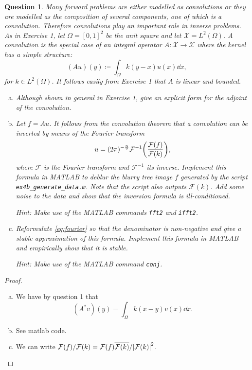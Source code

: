 \documentclass{article}
\theoremstyle{plain}
\newtheorem{question}{Question}
\theoremstyle{remark}
\newcommand{\Cal}{\mathcal}
\newcommand\FF{\Cal F}
\newcommand\ceq\coloneqq %
\newcommand\XX{\Cal X}
\begin{document}
\begin{question}
	Many forward problems are either modelled as convolutions or they are modelled as the composition of several components, one of which is a convolution. Therefore convolutions play an important role in inverse problems. As in Exercise 1, let $\Omega =[0, 1]^2$ be the unit square and let $\XX = L^2(\Omega)$. A convolution is the special case of an integral operator $A \colon \XX \to \XX$ where the kernel has a simple structure: 
	\[
	(Au)(y) \ceq \int_\Omega k(y - x) u(x) \dd{x},
	\]
	for $k \in L^2(\Omega)$. It follows easily from Exercise 1 that $A$ is linear and bounded. 
	\begin{enumerate}[(a)]
		\item Although shown in general in Exercise 1, give an explicit form for the adjoint of the convolution. 
		\item Let $f = Au$. It follows from the convolution theorem that a convolution can be inverted by means of the Fourier transform
		\begin{equation} \label{eq:fourier}
		u = (2\pi)^{-\frac n2} \FF^{-1} \qty(\frac{\FF(f)}{\FF(k)}),
		\end{equation}
		where $\FF$ is the Fourier transform and $\FF^{-1}$ its inverse. Implement this formula in \emph{MATLAB} to deblur the blurry tree image $f$ generated by the script \verb|ex4b_generate_data.m|. Note that the script also outputs $\FF(k)$. Add some noise to the data and show that the inversion formula is ill-conditioned.
		
		Hint: Make use of the \emph{MATLAB} commands \verb|fft2| and \verb|ifft2|. 
		
		\item Reformulate \cref{eq:fourier} so that the denominator is non-negative and give a stable approximation of this formula. Implement this formula in MATLAB and empirically show that it is stable.  
		
		Hint: Make use of the \emph{MATLAB} command \verb|conj|. 
	\end{enumerate}
\end{question}

\begin{proof}
	\begin{enumerate}[(a)]
		\item We have by question 1 that
		\[
		(A^* v)(y) = \int_\Omega k(x - y)v(x) \dd{x}.
		\]
		\item See matlab code. 
		\item We can write $\FF(f) / \FF(k) = \FF(f) \overline{\FF(k)} / \abs{\FF(k)}^2$. 
	\end{enumerate}
\end{proof}
\end{document}
